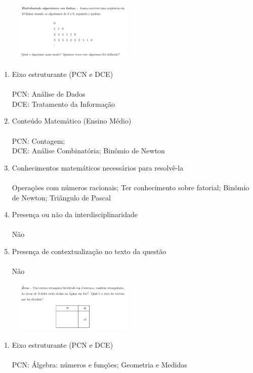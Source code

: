 \documentclass[a4paper, 12pt]{article}
\begin{document}
\begin{enumerate}
\begin{figure}[h!]
  \centering
  \includegraphics[width=0.5\textwidth]{2}
\end{figure} 
  \begin{enumerate}
  \item Eixo estruturante (PCN e DCE)\\\\
    PCN: Análise de Dados\\
    DCE: Tratamento da Informação 
  \item Conteúdo Matemático (Ensino Médio) \\\\
    PCN: Contagem;\\
    DCE: Análise Combinatória; Binômio de Newton
  \item Conhecimentos matemáticos necessários para resolvê-la \\\\
    Operações com números racionais; Ter conhecimento sobre fatorial; Binômio de Newton; Triângulo de Pascal
  \item Presença ou não da interdisciplinaridade \\\\
    Não
  \item Presença de contextualização no texto da questão\\\\
    Não
  \end{enumerate}
\begin{figure}[h!]
  \centering
  \includegraphics[width=0.5\textwidth]{3}
\end{figure} 
  \begin{enumerate}
  \item Eixo estruturante (PCN e DCE)\\\\
    PCN: Álgebra: números e funções; Geometria e Medidas\\

\end{enumerate}
\end{enumerate}
\end{document}
